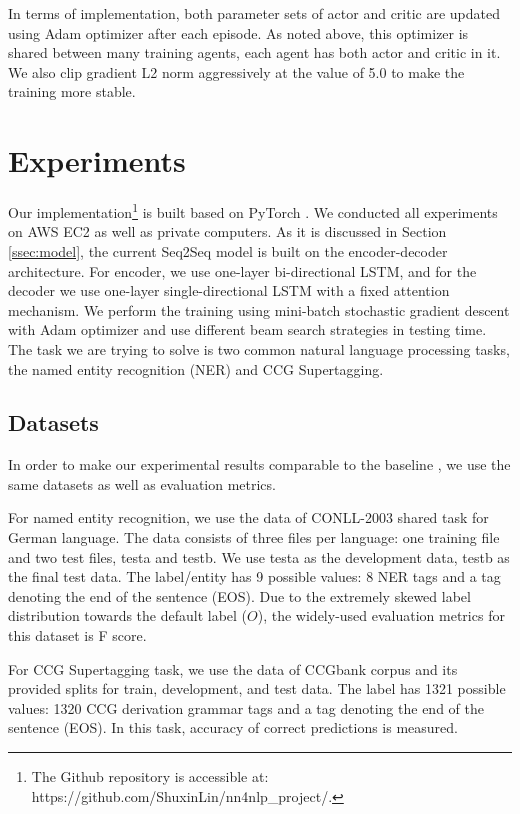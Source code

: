 \documentclass[11pt,a4paper]{article}
\begin{document}
In terms of implementation, both parameter sets of actor and critic are updated using Adam optimizer after each episode. As noted above, this optimizer is shared between many training agents, each agent has both actor and critic in it. We also clip gradient L2 norm aggressively at the value of 5.0 to make the training more stable. 


\section{Experiments}

Our implementation\footnote{The Github repository is accessible at: https://github.com/ShuxinLin/nn4nlp\_project/.} is built based on PyTorch \cite{paszke2017automatic}. We conducted all experiments on AWS EC2 as well as private computers. As it is discussed in Section \ref{ssec:model}, the current Seq2Seq model is built on the encoder-decoder architecture. For encoder, we use one-layer bi-directional LSTM, and for the decoder we use one-layer single-directional LSTM with a fixed attention mechanism. We perform the training using mini-batch stochastic gradient descent with Adam optimizer and use different beam search strategies in testing time. The task we are trying to solve is two common natural language processing tasks, the named entity recognition (NER) and CCG Supertagging.

\subsection{Datasets}
In order to make our experimental results comparable to the baseline \cite{goyal2017continuous}, we use the same datasets as well as evaluation metrics. 

For named entity recognition, we use the data of CONLL-2003 shared task \cite{tjongkimsang2003conll} for German language. The data consists of three files per language: one training file and two test files, testa and testb. We use testa as the development data, testb as the final test data.  The label/entity has 9 possible values: 8 NER tags and a tag denoting the end of the sentence (EOS). Due to the extremely skewed label distribution towards the default label ($O$), the widely-used evaluation metrics for this dataset is F score.

 For CCG Supertagging task, we use the data of CCGbank corpus \cite{hockenmaier2007ccgbank} and its provided splits for train, development, and test data. The label has 1321 possible values: 1320 CCG derivation grammar tags and a tag denoting the end of the sentence (EOS). In this task, accuracy of correct predictions is measured.
\end{document}
